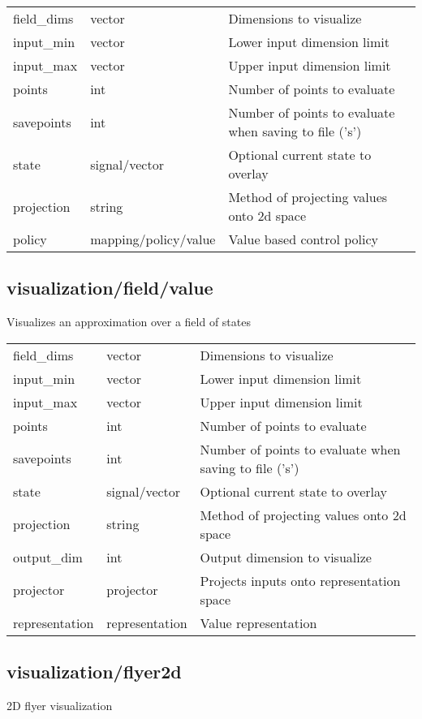 \noindent\begin{tabular}{@{}lll@{}}
field\_dims&vector&Dimensions to visualize\\
input\_min&vector&Lower input dimension limit\\
input\_max&vector&Upper input dimension limit\\
points&int&Number of points to evaluate\\
savepoints&int&Number of points to evaluate when saving to file ('s')\\
state&signal/vector&Optional current state to overlay\\
projection&string&Method of projecting values onto 2d space\\
policy&mapping/policy/value&Value based control policy\\
\end{tabular}
\subsection{visualization/field/value}
\noindent Visualizes an approximation over a field of states\\

\noindent\begin{tabular}{@{}lll@{}}
field\_dims&vector&Dimensions to visualize\\
input\_min&vector&Lower input dimension limit\\
input\_max&vector&Upper input dimension limit\\
points&int&Number of points to evaluate\\
savepoints&int&Number of points to evaluate when saving to file ('s')\\
state&signal/vector&Optional current state to overlay\\
projection&string&Method of projecting values onto 2d space\\
output\_dim&int&Output dimension to visualize\\
projector&projector&Projects inputs onto representation space\\
representation&representation&Value representation\\
\end{tabular}
\subsection{visualization/flyer2d}
\noindent 2D flyer visualization\\

